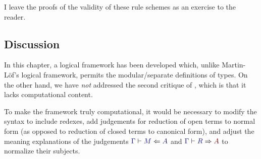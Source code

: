 \documentclass[main.tex]{subfiles}
\begin{document}
I leave the proofs of the validity of these rule schemes as an
exercise to the reader.

\subsection{Discussion} 

In this chapter, a logical framework has been developed which, unlike
Martin-L\"of's logical framework, permits the modular/separate
definitions of types. On the other hand, we have \emph{not} addressed
the second critique of \MLLF, which is that it lacks computational
content.

To make the framework truly computational, it would be necessary to
modify the syntax to include redexes, add judgements for reduction of
open terms to normal form (as opposed to reduction of closed terms to
canonical form), and adjust the meaning explanations of the judgements
$\lfsequent\Gamma\checks{M}{A}$ and $\lfsequent\Gamma\infers{R}{A}$ to
normalize their subjects.
\end{document}
